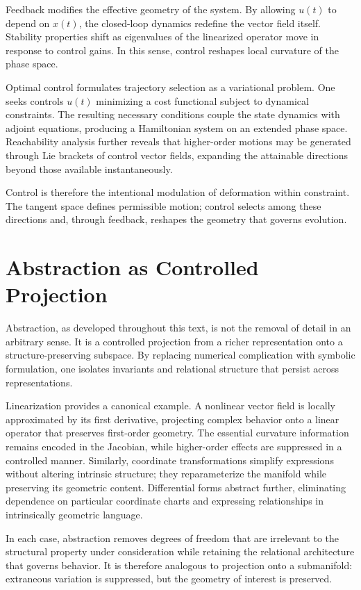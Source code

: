 \documentclass[12pt]{book}
\begin{document}
Feedback modifies the effective geometry of the system. By allowing
$u(t)$ to depend on $x(t)$, the closed-loop dynamics redefine the
vector field itself. Stability properties shift as eigenvalues of the
linearized operator move in response to control gains. In this sense,
control reshapes local curvature of the phase space.

Optimal control formulates trajectory selection as a variational
problem. One seeks controls $u(t)$ minimizing a cost functional subject
to dynamical constraints. The resulting necessary conditions couple the
state dynamics with adjoint equations, producing a Hamiltonian system
on an extended phase space. Reachability analysis further reveals that
higher-order motions may be generated through Lie brackets of control
vector fields, expanding the attainable directions beyond those
available instantaneously.

Control is therefore the intentional modulation of deformation within
constraint. The tangent space defines permissible motion; control
selects among these directions and, through feedback, reshapes the
geometry that governs evolution.

\section{Abstraction as Controlled Projection}

Abstraction, as developed throughout this text, is not the removal of
detail in an arbitrary sense. It is a controlled projection from a
richer representation onto a structure-preserving subspace. By
replacing numerical complication with symbolic formulation, one
isolates invariants and relational structure that persist across
representations.

Linearization provides a canonical example. A nonlinear vector field is
locally approximated by its first derivative, projecting complex
behavior onto a linear operator that preserves first-order geometry.
The essential curvature information remains encoded in the Jacobian,
while higher-order effects are suppressed in a controlled manner.
Similarly, coordinate transformations simplify expressions without
altering intrinsic structure; they reparameterize the manifold while
preserving its geometric content. Differential forms abstract further,
eliminating dependence on particular coordinate charts and expressing
relationships in intrinsically geometric language.

In each case, abstraction removes degrees of freedom that are
irrelevant to the structural property under consideration while
retaining the relational architecture that governs behavior.
It is therefore analogous to projection onto a submanifold:
extraneous variation is suppressed, but the geometry of interest
is preserved.
\end{document}
